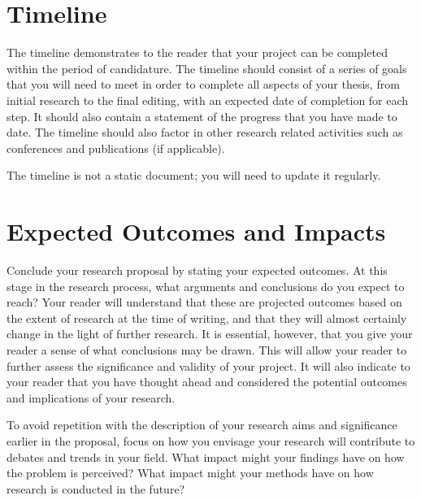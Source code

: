 \documentclass[12pt, a4paper]{article}
\begin{document}
\section{Timeline}
The timeline demonstrates to the reader that your project can be completed within the period of candidature. The timeline should consist of a series of goals that you will need to meet in order to complete all aspects of your thesis, from initial research to the final editing, with an expected date of completion for each step. It should also contain a statement of the progress that you have made to date. The timeline should also factor in other research related activities such as conferences and publications (if applicable).

The timeline is not a static document; you will need to update it regularly.


\section{Expected Outcomes and Impacts}
Conclude your research proposal by stating your expected outcomes. At this stage in the research process, what arguments and conclusions do you expect to reach? Your reader will understand that these are projected outcomes based on the extent of research at the time of writing, and that they will almost certainly change in the light of further research. It is essential, however, that you give your reader a sense of what conclusions may be drawn. This will allow your reader to further assess the significance and validity of your project. It will also indicate to your reader that you have thought ahead and considered the potential outcomes and implications of your research.

To avoid repetition with the description of your research aims and significance earlier in the proposal, focus on how you envisage your research will contribute to debates and trends in your field. What impact might your findings have on how the problem is perceived? What impact might your methods have on how research is conducted in the future?




\end{document}
